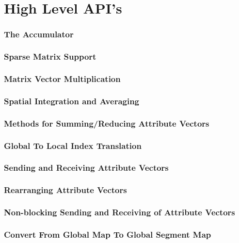 \documentclass{article}
\begin{document}
\part{High Level API's}
\section{The Accumulator}



\section{Sparse Matrix Support}




%
\section{Matrix Vector Multiplication}

%
\section{Spatial Integration and Averaging}

%
\section{Methods for Summing/Reducing Attribute Vectors}

%
\section{Global To Local Index Translation}

%
\section{Sending and Receiving Attribute Vectors}


%
\section{Rearranging Attribute Vectors}

%
\section{Non-blocking Sending and Receiving of Attribute Vectors}

%
\section{Convert From Global Map To Global Segment Map}



 
%
\end{document}
